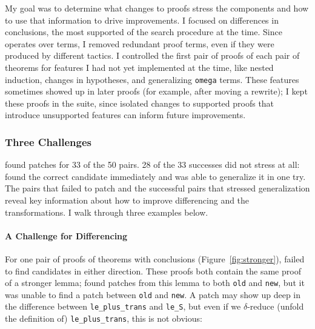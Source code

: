 My goal was to determine what changes to proofs stress the components
and how to use that information to drive improvements.
I focused on differences in conclusions, the most supported  of the search procedure at the time.
Since \sysname operates over terms,
I removed redundant proof terms, even if they were produced by different tactics.
I controlled the first pair of proofs of each pair of theorems for features I had not yet implemented at the time,
like nested induction, changes in hypotheses, and generalizing \lstinline{omega} terms.
These features sometimes showed up in later proofs (for example, after moving a rewrite);
I kept these proofs in the suite, since isolated changes to supported proofs that
introduce unsupported features can inform future improvements.	

\subsubsection{Three Challenges}
\label{sec:fail}

\sysname found patches for 33 of the 50 pairs. 28 of the 33 successes
did not stress \sysname at all: \sysname found the correct candidate immediately and was able to generalize it
in one try.
The pairs that \sysname failed to patch and the successful pairs that stressed generalization
reveal key information about how to improve differencing and the transformations.
I walk through three examples below.

\paragraph{A Challenge for Differencing} For one pair of proofs of theorems 
with  conclusions (Figure~\ref{fig:stronger}),
 failed to find candidates in either direction.
These proofs both contain the same proof of a stronger lemma;
\sysname found patches from this lemma to
both \lstinline{old} and \lstinline{new},
but it was unable to find a patch between \lstinline{old} and \lstinline{new}.
A patch may show up deep in the difference between \lstinline{le_plus_trans}
and \lstinline{le_S}, but even if we $\delta$-reduce (unfold the definition of) \lstinline{le_plus_trans}, this is not obvious:

